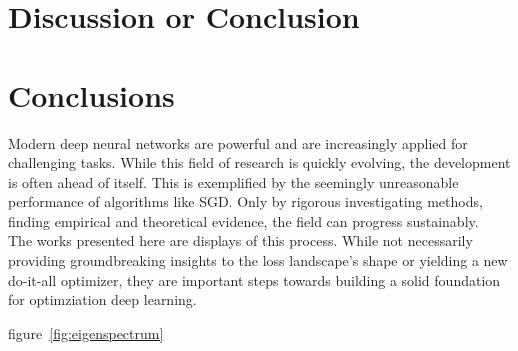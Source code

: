 \documentclass[a4paper]{scrartcl}
\begin{document}
\section*{Discussion or Conclusion}


\section{Conclusions}
\label{sec:conc}
Modern deep neural networks are powerful and are increasingly applied for challenging tasks. While this field of research is quickly evolving, the development is often ahead of itself. This is exemplified by the seemingly unreasonable performance of algorithms like SGD. Only by rigorous investigating methods, finding empirical and theoretical evidence, the field can progress sustainably.\\
The works presented here are displays of this process. While not necessarily providing groundbreaking insights to the loss landscape's shape or yielding a new do-it-all optimizer, they are important steps towards building a solid foundation for optimziation deep learning.

figure~\ref{fig:eigenspectrum}\\
\citet{baldassi2016unreasonable}



\newpage



	
\end{document}
